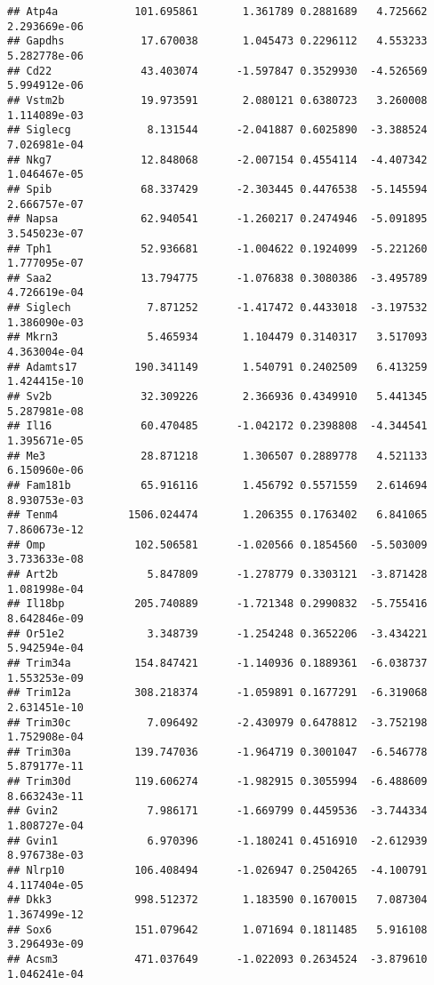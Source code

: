 \documentclass[
]{article}
\begin{document}
\begin{verbatim}
## Atp4a            101.695861       1.361789 0.2881689   4.725662 2.293669e-06
## Gapdhs            17.670038       1.045473 0.2296112   4.553233 5.282778e-06
## Cd22              43.403074      -1.597847 0.3529930  -4.526569 5.994912e-06
## Vstm2b            19.973591       2.080121 0.6380723   3.260008 1.114089e-03
## Siglecg            8.131544      -2.041887 0.6025890  -3.388524 7.026981e-04
## Nkg7              12.848068      -2.007154 0.4554114  -4.407342 1.046467e-05
## Spib              68.337429      -2.303445 0.4476538  -5.145594 2.666757e-07
## Napsa             62.940541      -1.260217 0.2474946  -5.091895 3.545023e-07
## Tph1              52.936681      -1.004622 0.1924099  -5.221260 1.777095e-07
## Saa2              13.794775      -1.076838 0.3080386  -3.495789 4.726619e-04
## Siglech            7.871252      -1.417472 0.4433018  -3.197532 1.386090e-03
## Mkrn3              5.465934       1.104479 0.3140317   3.517093 4.363004e-04
## Adamts17         190.341149       1.540791 0.2402509   6.413259 1.424415e-10
## Sv2b              32.309226       2.366936 0.4349910   5.441345 5.287981e-08
## Il16              60.470485      -1.042172 0.2398808  -4.344541 1.395671e-05
## Me3               28.871218       1.306507 0.2889778   4.521133 6.150960e-06
## Fam181b           65.916116       1.456792 0.5571559   2.614694 8.930753e-03
## Tenm4           1506.024474       1.206355 0.1763402   6.841065 7.860673e-12
## Omp              102.506581      -1.020566 0.1854560  -5.503009 3.733633e-08
## Art2b              5.847809      -1.278779 0.3303121  -3.871428 1.081998e-04
## Il18bp           205.740889      -1.721348 0.2990832  -5.755416 8.642846e-09
## Or51e2             3.348739      -1.254248 0.3652206  -3.434221 5.942594e-04
## Trim34a          154.847421      -1.140936 0.1889361  -6.038737 1.553253e-09
## Trim12a          308.218374      -1.059891 0.1677291  -6.319068 2.631451e-10
## Trim30c            7.096492      -2.430979 0.6478812  -3.752198 1.752908e-04
## Trim30a          139.747036      -1.964719 0.3001047  -6.546778 5.879177e-11
## Trim30d          119.606274      -1.982915 0.3055994  -6.488609 8.663243e-11
## Gvin2              7.986171      -1.669799 0.4459536  -3.744334 1.808727e-04
## Gvin1              6.970396      -1.180241 0.4516910  -2.612939 8.976738e-03
## Nlrp10           106.408494      -1.026947 0.2504265  -4.100791 4.117404e-05
## Dkk3             998.512372       1.183590 0.1670015   7.087304 1.367499e-12
## Sox6             151.079642       1.071694 0.1811485   5.916108 3.296493e-09
## Acsm3            471.037649      -1.022093 0.2634524  -3.879610 1.046241e-04

\end{verbatim}
\end{document}
